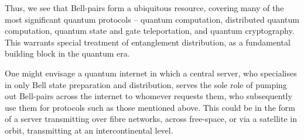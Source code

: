 Thus, we see that Bell-pairs form a ubiquitous resource, covering many of the most significant quantum protocols -- quantum computation, distributed quantum computation, quantum state and gate teleportation, and quantum cryptography. This warrants special treatment of entanglement distribution, as a fundamental building block in the quantum era.

One might envisage a quantum internet in which a central server, who specialises in only Bell state preparation and distribution, serves the sole role of pumping out Bell-pairs across the internet to whomever requests them, who subsequently use them for protocols such as those mentioned above. This could be in the form of a server transmitting over fibre networks, across free-space, or via a satellite in orbit, transmitting at an intercontinental level.

